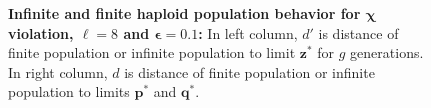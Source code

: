 \begin{figure}[!b]
\begin{center}
\hspace{-3em}%
\vspace{-0.5em} \hspace{-3em}%


\caption[\textbf{Infinite and finite haploid population behavior for $\bm{\chi}$ violation, $\ell = 8$ and $\bm{\epsilon} = 0.1$}]
{\textbf{Infinite and finite haploid population behavior for $\bm{\chi}$ violation, $\ell = 8$ and $\bm{\epsilon} = 0.1$:} 
  In left column, $d'$ is distance of finite population or infinite population to limit $\bm{z}^\ast$ for $g$ generations. 
  In right column, $d$ is distance of finite population or infinite population to limits $\bm{p}^\ast$ and $\bm{q}^\ast$.}
\label{oscillation_8h_vio_chi_0.1}
\end{center}
\end{figure}

